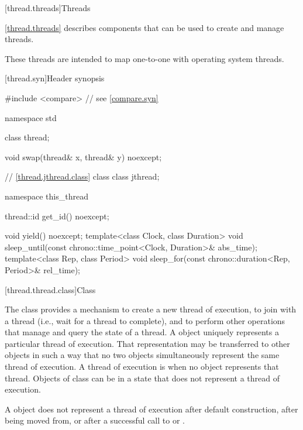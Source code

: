 [thread.threads]{Threads}

\pnum
\ref{thread.threads} describes components that can be used to create and manage threads.
\begin{note}
These threads are intended to map one-to-one with operating system threads.
\end{note}

[thread.syn]{Header  synopsis}

%
\begin{codeblock}
#include <compare>              // see \ref{compare.syn}

namespace std {
  class thread;

  void swap(thread& x, thread& y) noexcept;

  // \ref{thread.jthread.class} class 
  class jthread;

  namespace this_thread {
    thread::id get_id() noexcept;

    void yield() noexcept;
    template<class Clock, class Duration>
      void sleep_until(const chrono::time_point<Clock, Duration>& abs_time);
    template<class Rep, class Period>
      void sleep_for(const chrono::duration<Rep, Period>& rel_time);
  }
}
\end{codeblock}

[thread.thread.class]{Class }

\pnum
The class  provides a mechanism to create a new thread of execution, to join with
a thread (i.e., wait for a thread to complete), and to perform other operations that manage and
query the state of a thread. A  object uniquely represents a particular thread of
execution. That representation may be transferred to other  objects in such a way
that no two  objects simultaneously represent the same thread of execution. A
thread of execution is  when no  object represents that thread.
Objects of class  can be in a state that does not represent a thread of
execution.
\begin{note}
A  object does not represent a thread of execution after
default construction, after being moved from, or after a successful call to  or
.
\end{note}

